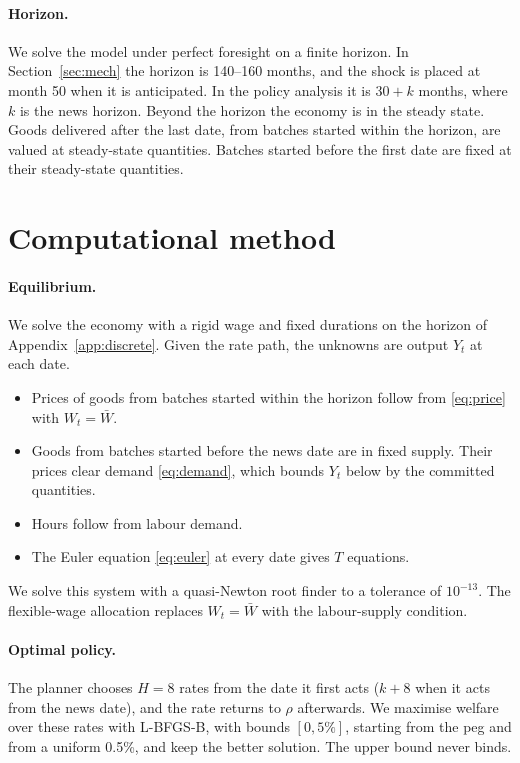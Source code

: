 \documentclass[11pt]{article}
\theoremstyle{definition}
\begin{document}
\paragraph{Horizon.} We solve the model under perfect foresight on a finite horizon. In
Section~\ref{sec:mech} the horizon is 140--160 months, and the shock is placed at month 50 when it is
anticipated. In the policy analysis it is $30+k$ months, where $k$ is the news horizon. Beyond the
horizon the economy is in the steady state. Goods delivered after the last date, from batches started
within the horizon, are valued at steady-state quantities. Batches started before the first date are
fixed at their steady-state quantities.

\section{Computational method}\label{app:comp}

\paragraph{Equilibrium.} We solve the economy with a rigid wage and fixed durations on the horizon of
Appendix~\ref{app:discrete}. Given the rate path, the unknowns are output $Y_t$ at each date.
\begin{itemize}
  \item Prices of goods from batches started within the horizon follow from \eqref{eq:price} with
        $W_t=\bar W$.
  \item Goods from batches started before the news date are in fixed supply. Their prices clear
        demand \eqref{eq:demand}, which bounds $Y_t$ below by the committed quantities.
  \item Hours follow from labour demand.
  \item The Euler equation \eqref{eq:euler} at every date gives $T$ equations.
\end{itemize}
We solve this system with a quasi-Newton root finder to a tolerance of $10^{-13}$. The
flexible-wage allocation replaces $W_t=\bar W$ with the labour-supply condition.

\paragraph{Optimal policy.} The planner chooses $H=8$ rates from the date it first acts ($k+8$ when it
acts from the news date), and the rate returns to $\rho$ afterwards. We maximise welfare over these
rates with L-BFGS-B, with bounds $[0,5\%]$, starting from the peg and from a uniform 0.5\%, and keep the
better solution. The upper bound never binds.
\end{document}
